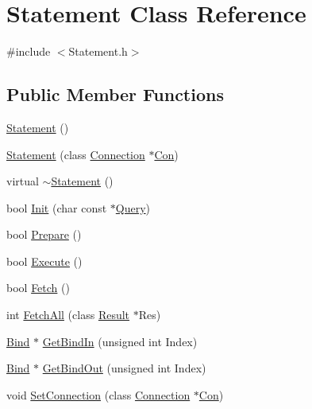 \hypertarget{class_statement}{}\section{Statement Class Reference}
\label{class_statement}


{\ttfamily \#include $<$Statement.\+h$>$}

\subsection*{Public Member Functions}
\begin{DoxyCompactItemize}
\item 
\hyperlink{class_statement_ab48acf95bec5dea254f44390c6221eb1}{Statement} ()
\item 
\hyperlink{class_statement_a462a77910215910891f4f826126c9bcd}{Statement} (class \hyperlink{class_connection}{Connection} $\ast$\hyperlink{class_statement_a6d0ec1140215c6d723155ec16e0c4227}{Con})
\item 
virtual \hyperlink{class_statement_a57fdfef84b5f92d83850f6467b46012a}{$\sim$\+Statement} ()
\item 
bool \hyperlink{class_statement_a5290dbeb5b7a220516a844ce6ddefdb2}{Init} (char const $\ast$\hyperlink{class_statement_a88a32c1c42ef234f2b417d05375d2a3d}{Query})
\item 
bool \hyperlink{class_statement_afd845c4e7726c6177c62e5634bfb171c}{Prepare} ()
\item 
bool \hyperlink{class_statement_a3c1844a7ef1c75e86779a4700b327936}{Execute} ()
\item 
bool \hyperlink{class_statement_ab0b31402ce109c58736fc1a6e2f16205}{Fetch} ()
\item 
int \hyperlink{class_statement_a50535656ec9de583b228e909fd1bcc2e}{Fetch\+All} (class \hyperlink{class_result}{Result} $\ast$Res)
\item 
\hyperlink{class_bind}{Bind} $\ast$ \hyperlink{class_statement_aa0ddbcc8f3c44211ecb79a15a6407938}{Get\+Bind\+In} (unsigned int Index)
\item 
\hyperlink{class_bind}{Bind} $\ast$ \hyperlink{class_statement_af305da0cac3caf4936781127a9373534}{Get\+Bind\+Out} (unsigned int Index)
\item 
void \hyperlink{class_statement_a93b31fae72eb0d71b9daa043e7131dbf}{Set\+Connection} (class \hyperlink{class_connection}{Connection} $\ast$\hyperlink{class_statement_a6d0ec1140215c6d723155ec16e0c4227}{Con})
\end{DoxyCompactItemize}
